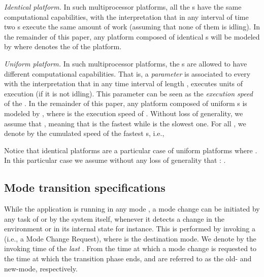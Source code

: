 \documentclass{article}
\newtheorem{validity test}{Validity Test}
\begin{document}
\textit{Identical platform.} In such multiprocessor platforms, all the s have the same computational capabilities, with the interpretation that in any interval of time two s execute the same amount of work (assuming that none of them is idling). In the remainder of this paper, any platform composed of  identical s will be modeled by  where  denotes the   of the platform.

\textit{Uniform platform.} In such multiprocessor platforms, the s are allowed to have different computational capabilities. That is, a \emph{parameter}  is associated to every   with the interpretation that in any time interval of length ,   executes  units of execution (if it is not idling). This parameter can be seen as the \emph{execution speed} of the . In the remainder of this paper, any platform composed of  uniform s is modeled by , where  is the execution speed of  . Without loss of generality, we assume that  , meaning that   is the fastest  while  is the slowest one. For all , we denote by  the cumulated speed of the  fastest s, i.e., 


Notice that identical platforms are a particular case of uniform platforms where  . In this particular case we assume without any loss of generality that : . 

\subsection{Mode transition specifications}
\label{sec:Multimode:mode_transition_specifications}

While the application is running in any mode , a mode change can be initiated by any task of  or by the system itself, whenever it detects a change in the environment or in its internal state for instance. This is performed by invoking a  (i.e., a Mode Change Request), where  is the destination mode. We denote by  the invoking time of the \emph{last} . From the time at which a mode change is requested to the time at which the transition phase ends,  and  are referred to as the old- and new-mode, respectively. 
\end{document}
